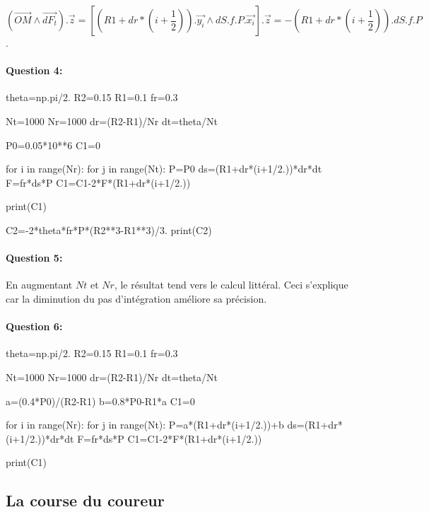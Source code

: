 $(\overrightarrow{OM}\wedge \overrightarrow{dF_t}).\overrightarrow{z}=\left[(R1+dr*(i+\dfrac{1}{2})).\overrightarrow{y_i}\wedge dS.f.P.\overrightarrow{x_i}\right].\overrightarrow{z}=-(R1+dr*(i+\dfrac{1}{2})).dS.f.P$.

\paragraph{Question 4:} 

\begin{verbatimtab}[3]

theta=np.pi/2.
R2=0.15
R1=0.1
fr=0.3

Nt=1000
Nr=1000
dr=(R2-R1)/Nr
dt=theta/Nt

P0=0.05*10**6
C1=0

for i in range(Nr):
	for j in range(Nt):
		P=P0
		ds=(R1+dr*(i+1/2.))*dr*dt
		F=fr*ds*P
		C1=C1-2*F*(R1+dr*(i+1/2.))  
    
print(C1)

C2=-2*theta*fr*P*(R2**3-R1**3)/3.
print(C2)
\end{verbatimtab}



\paragraph{Question 5:} En augmentant $Nt$ et $Nr$, le résultat tend vers le calcul littéral. Ceci s'explique car la diminution du pas d'intégration améliore sa précision.

\paragraph{Question 6:} 

\begin{verbatimtab}[3]

theta=np.pi/2.
R2=0.15
R1=0.1
fr=0.3

Nt=1000
Nr=1000
dr=(R2-R1)/Nr
dt=theta/Nt

a=(0.4*P0)/(R2-R1)
b=0.8*P0-R1*a
C1=0

for i in range(Nr):
     for j in range(Nt):
         P=a*(R1+dr*(i+1/2.))+b
         ds=(R1+dr*(i+1/2.))*dr*dt
         F=fr*ds*P
         C1=C1-2*F*(R1+dr*(i+1/2.))  
    
print(C1)
\end{verbatimtab}

\subsection{La course du coureur}

